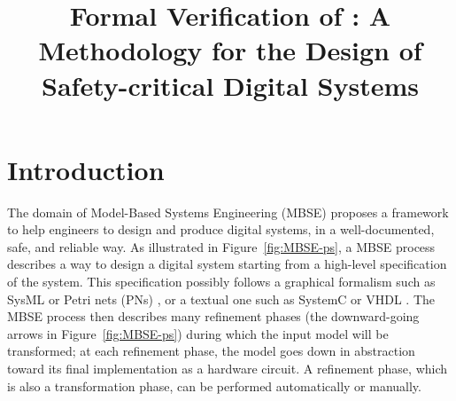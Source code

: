 \documentclass[pdflatex,sn-mathphys]{sn-jnl}%
\theoremstyle{thmstyleone}%
\theoremstyle{thmstyletwo}%
\theoremstyle{thmstylethree}%
\begin{document}
\title[Formal Verification of the \hilecop{} Methodology]{Formal
  Verification of \hilecop{}: A Methodology for the Design of
  Safety-critical Digital Systems}


\author*[1]{ }
\author[1]{ }
\author[2]{ }




\abstract{}

\keywords{}

\maketitle

\section{Introduction}
\label{sec:intro}

The domain of Model-Based Systems Engineering (MBSE) \cite{Long2011}
proposes a framework to help engineers to design and produce digital
systems, in a well-documented, safe, and reliable way. %
As illustrated in Figure~\ref{fig:MBSE-ps}, a MBSE process describes a
way to design a digital system starting from a high-level
specification of the system. This specification possibly follows a
graphical formalism such as SysML \cite{Friedenthal2014} or Petri nets
(PNs) \cite{Petri1962}, or a textual one such as SystemC
\cite{Black2009} or VHDL \cite{Ashenden2010}. The MBSE process then
describes many refinement phases (the downward-going arrows in
Figure~\ref{fig:MBSE-ps}) during which the input model will be
transformed; at each refinement phase, the model goes down in
abstraction toward its final implementation as a hardware circuit. A
refinement phase, which is also a transformation phase, can be
performed automatically or manually.
\end{document}

